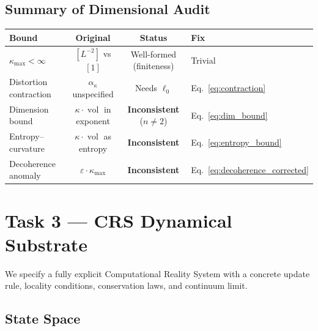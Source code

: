 \documentclass[11pt,a4paper]{article}
\theoremstyle{remark}
\DeclareMathOperator{\vol}{vol}
\begin{document}
\subsection{Summary of Dimensional Audit}

\begin{center}
\renewcommand{\arraystretch}{1.3}
\begin{tabular}{@{}lccl@{}}
\toprule
\textbf{Bound} & \textbf{Original} & \textbf{Status} & \textbf{Fix} \\
\midrule
$\kappa_{\max} < \infty$ & $[L^{-2}]$ vs $[1]$
  & Well-formed (finiteness) & Trivial \\
Distortion contraction & $\alpha_\kappa$ unspecified
  & Needs $\ell_0$ & Eq.~\eqref{eq:contraction} \\
Dimension bound & $\kappa \cdot \vol$ in exponent
  & \textbf{Inconsistent} ($n \neq 2$) & Eq.~\eqref{eq:dim_bound} \\
Entropy--curvature & $\kappa \cdot \vol$ as entropy
  & \textbf{Inconsistent} & Eq.~\eqref{eq:entropy_bound} \\
Decoherence anomaly & $\varepsilon \cdot \kappa_{\max}$
  & \textbf{Inconsistent} & Eq.~\eqref{eq:decoherence_corrected} \\
\bottomrule
\end{tabular}
\end{center}

\bigskip
\noindent{}

\section{Task 3 --- CRS Dynamical Substrate}
\label{sec:crs}

We specify a fully explicit Computational Reality System with a concrete
update rule, locality conditions, conservation laws, and continuum
limit.

\subsection{State Space}
\end{document}

